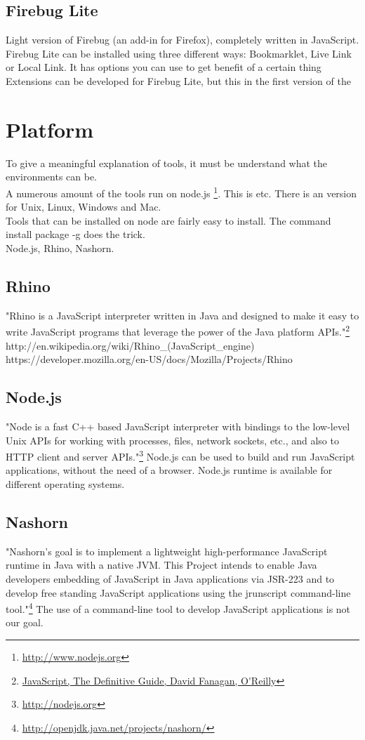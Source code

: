 \documentclass{article}
\begin{document}
\subsection {Firebug Lite}
Light version of Firebug (an add-in for Firefox), completely written in JavaScript.
Firebug Lite can be installed using three different ways: Bookmarklet, Live Link or Local Link.
It has options you can use to get benefit of a certain thing
Extensions can be developed for Firebug Lite, but this in the first version of the 

\section{Platform}
To give a meaningful explanation of tools, it must be understand what the environments can be.\\
A numerous amount of the tools run on node.js \footnote{\url{http://www.nodejs.org}}. This is etc.
There is an version for Unix, Linux, Windows and Mac.\\
Tools that can be installed on node are fairly easy to install. The command install package -g does the trick.\\
Node.js, Rhino, Nashorn.

\subsection{Rhino}
"Rhino is a JavaScript interpreter written in Java and designed to make it easy to write JavaScript programs 
that leverage the power of the Java platform APIs."\footnote{\url{JavaScript, The Definitive Guide, David Fanagan, O'Reilly}}\newline
http://en.wikipedia.org/wiki/Rhino\_(JavaScript\_engine)
https://developer.mozilla.org/en-US/docs/Mozilla/Projects/Rhino

\subsection{Node.js}
"Node is a fast C++ based JavaScript interpreter with bindings to the low-level 
Unix APIs for working with processes, files, network sockets, etc., and also to 
HTTP client and server APIs."\footnote{\url{http://nodejs.org}}
Node.js can be used to build and run JavaScript applications, without the need of a browser.
Node.js runtime is available for different operating systems.

\subsection{Nashorn}
"Nashorn's goal is to implement a lightweight high-performance JavaScript runtime in Java with a native JVM.
This Project intends to enable Java developers embedding of JavaScript in Java applications via JSR-223 and to develop 
free standing JavaScript applications using the jrunscript command-line tool."\footnote{\url{http://openjdk.java.net/projects/nashorn/}}
The use of a command-line tool to develop JavaScript applications is not our goal.
\end{document}
